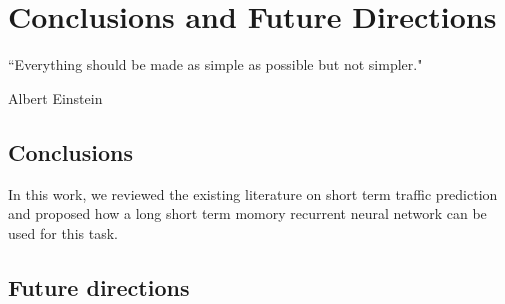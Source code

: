 
\chapter{Conclusions and Future Directions} %

\label{Chapter6} %


``Everything should be made as simple as possible but not simpler."

\begin{flushright}
Albert Einstein
\end{flushright}


\section{Conclusions}

In this work, we reviewed the existing literature on short term traffic prediction and proposed
how a long short term momory recurrent neural network can be used for this task.


\section{Future directions}
